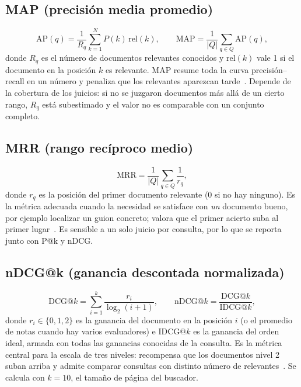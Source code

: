 \documentclass[11pt,spanish]{article}
\begin{document}
\subsection{MAP (precisión media promedio)}
\begin{equation}
  \mathrm{AP}(q) = \frac{1}{R_q}\sum_{k=1}^{N} P(k)\,\mathrm{rel}(k),
  \qquad
  \mathrm{MAP} = \frac{1}{|Q|}\sum_{q \in Q} \mathrm{AP}(q),
\end{equation}
donde $R_q$ es el número de documentos relevantes conocidos y
$\mathrm{rel}(k)$ vale 1 si el documento en la posición $k$ es relevante. MAP
resume toda la curva precisión--recall en un número y penaliza que los
relevantes aparezcan tarde~\cite{manning2008}. Depende de la cobertura de los
juicios: si no se juzgaron documentos más allá de un cierto rango, $R_q$ está
subestimado y el valor no es comparable con un conjunto completo.

\subsection{MRR (rango recíproco medio)}
\begin{equation}
  \mathrm{MRR} = \frac{1}{|Q|}\sum_{q \in Q}\frac{1}{r_q},
\end{equation}
donde $r_q$ es la posición del primer documento relevante (0 si no hay
ninguno). Es la métrica adecuada cuando la necesidad se satisface con
\emph{un} documento bueno, por ejemplo localizar un guion concreto; valora que
el primer acierto suba al primer lugar~\cite{voorhees2000}. Es sensible a un
solo juicio por consulta, por lo que se reporta junto con P@k y nDCG.

\subsection{nDCG@k (ganancia descontada normalizada)}
\begin{equation}
  \mathrm{DCG}@k = \sum_{i=1}^{k}\frac{r_i}{\log_2(i+1)},
  \qquad
  \mathrm{nDCG}@k = \frac{\mathrm{DCG}@k}{\mathrm{IDCG}@k},
\end{equation}
donde $r_i \in \{0,1,2\}$ es la ganancia del documento en la posición $i$ (o el
promedio de notas cuando hay varios evaluadores) e $\mathrm{IDCG}@k$ es la
ganancia del orden ideal, armada con todas las ganancias conocidas de la
consulta. Es la métrica central para la escala de tres niveles: recompensa que
los documentos nivel 2 suban arriba y admite comparar consultas con distinto
número de relevantes~\cite{jarvelin2002}. Se calcula con $k=10$, el tamaño de
página del buscador.
\end{document}
